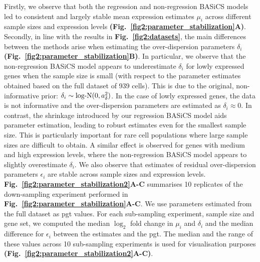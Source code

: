 Firstly, we observe that both the regression and non-regression BASiCS models led to consistent and largely stable mean expression estimates $\mu_i$ across different sample sizes and expression levels \textbf{(Fig.~\ref{fig2:parameter_stabilization}A)}. 
Secondly, in line with the results in \textbf{Fig.~\ref{fig2:datasets}}, the main differences between the methods arise when estimating the over-dispersion parameters $\delta_i$ \textbf{(Fig.~\ref{fig2:parameter_stabilization}B)}. 
In particular, we observe that the non-regression BASiCS model appears to underestimate $\delta_i$ for lowly expressed genes when the sample size is small (with respect to the parameter estimates obtained based on the full dataset of 939 cells). 
This is due to the original, non-informative prior: $\delta_i\sim\textnormal{log-N}(0,a_\delta^2)$. 
In the case of lowly expressed genes, the data is not informative and the over-dispersion parameters are estimated as $\delta_i\approx{}0$. In contrast, the shrinkage introduced by our regression BASiCS model aids parameter estimation, leading to robust estimates even for the smallest sample size. 
This is particularly important for rare cell populations where large sample sizes are difficult to obtain. 
A similar effect is observed for genes with medium and high expression levels, where the non-regression BASiCS model appears to slightly overestimate $\delta_i$. 
We also observe that estimates of residual over-dispersion parameters $\epsilon_i$ are stable across sample sizes and expression levels. \textbf{Fig.~\ref{fig2:parameter_stabilization2}A-C} summarises 10 replicates of the down-sampling experiment performed in \textbf{Fig.~\ref{fig2:parameter_stabilization}A-C}. 
We use parameters estimated from the full dataset as \gls{pgt} values. 
For each sub-sampling experiment, sample size and gene set, we computed the median $\log_2$ fold change in $\mu_i$ and $\delta_i$ and the median difference for $\epsilon_i$ between the estimates and the \gls{pgt}. 
The median and the range of these values across 10 sub-sampling experiments is used for visualisation purposes \textbf{(Fig.~\ref{fig2:parameter_stabilization2}A-C)}. 

